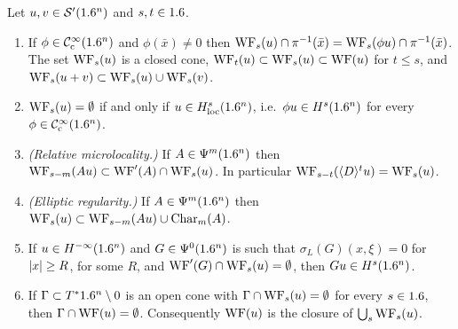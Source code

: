 \begin{proposition}\label{microlocal:prop:wf-s}
  Let $u,v\in\mathcal{S}'(1.6^n)$ and $s,t\in1.6$.
  \begin{enumerate}[label=\textup{(\roman*)}]
  \item If $\phi\in\mathcal{C}^\infty_{\mathrm{c}}(1.6^n)$ and $\phi(\bar x)\ne0$ then
    $\operatorname{WF}_s(u)\cap\pi^{-1}(\bar x)=\operatorname{WF}_s(\phi u)\cap\pi^{-1}(\bar x)$. The set
    $\operatorname{WF}_s(u)$ is a closed cone,
    $\operatorname{WF}_t(u)\subset\operatorname{WF}_s(u)\subset\operatorname{WF}(u)$ for $t\le s$, and
    $\operatorname{WF}_s(u+v)\subset\operatorname{WF}_s(u)\cup\operatorname{WF}_s(v)$.
  \item $\operatorname{WF}_s(u)=\emptyset$ if and only if $u\in H^s_{\mathrm{loc}}(1.6^n)$,
    i.e.\ $\phi u\in H^s(1.6^n)$ for every $\phi\in\mathcal{C}^\infty_{\mathrm{c}}(1.6^n)$.
  \item \emph{(Relative microlocality.)} If $A\in\Psi^{m}(1.6^n)$ then
    $\operatorname{WF}_{s-m}(Au)\subset\operatorname{WF}'(A)\cap\operatorname{WF}_s(u)$. In particular
    $\operatorname{WF}_{s-t}(\langle D\rangle^tu)=\operatorname{WF}_s(u)$.
  \item \emph{(Elliptic regularity.)} If $A\in\Psi^{m}(1.6^n)$ then
    $\operatorname{WF}_s(u)\subset\operatorname{WF}_{s-m}(Au)\cup\operatorname{Char}_m(A)$.
  \item If $u\in H^{-\infty}(1.6^n)$ and $G\in\Psi^{0}(1.6^n)$ is such that
    $\sigma_L(G)(x,\xi)=0$ for $\lvert x\rvert\ge R$, for some $R$, and
    $\operatorname{WF}'(G)\cap\operatorname{WF}_s(u)=\emptyset$, then $Gu\in H^s(1.6^n)$.
  \item If $\Gamma\subset T^*1.6^n\setminus0$ is an open cone with
    $\Gamma\cap\operatorname{WF}_s(u)=\emptyset$ for every $s\in1.6$, then
    $\Gamma\cap\operatorname{WF}(u)=\emptyset$. Consequently $\operatorname{WF}(u)$ is the closure of
    $\bigcup_s\operatorname{WF}_s(u)$.
  \end{enumerate}
\end{proposition}
